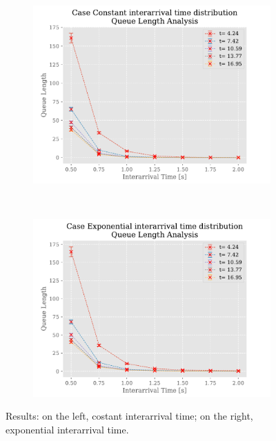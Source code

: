 \documentclass[a4paper,12pt]{article}
\begin{document}
\begin{figure}
\begin{subfigure}[b]{.45\textwidth}
    \label{fig:exp:exp:delay}
  \end{subfigure}
  \\
  \begin{subfigure}[b]{.45\textwidth}
    \includegraphics[width=\textwidth]{img/QueueLengthP2Const.pdf}
    \label{fig:exp:const:queue}
  \end{subfigure}
  ~
  \begin{subfigure}[b]{.45\textwidth}
    \includegraphics[width=\textwidth]{img/QueueLengthP2Exp.pdf}
    \label{fig:exp:exp:queue}
  \end{subfigure}
  \caption{Results: on the left, costant interarrival time; on the right, exponential interarrival time.}
  \label{fig:result-0}
\end{figure}
\end{document}
